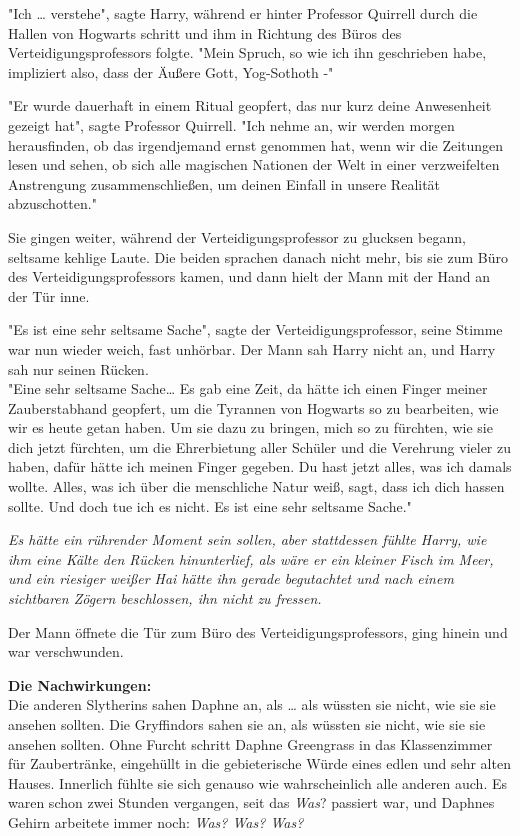 {"Ich … verstehe", sagte Harry, während er hinter Professor Quirrell durch die Hallen von Hogwarts schritt und ihm in Richtung des Büros des Verteidigungsprofessors folgte. "Mein Spruch, so wie ich ihn geschrieben habe, impliziert also, dass der Äußere Gott, Yog-Sothoth -"

"Er wurde dauerhaft in einem Ritual geopfert, das nur kurz deine Anwesenheit gezeigt hat", sagte Professor Quirrell. "Ich nehme an, wir werden morgen herausfinden, ob das irgendjemand ernst genommen hat, wenn wir die Zeitungen lesen und sehen, ob sich alle magischen Nationen der Welt in einer verzweifelten Anstrengung zusammenschließen, um deinen Einfall in unsere Realität abzuschotten."

Sie gingen weiter, während der Verteidigungsprofessor zu glucksen begann, seltsame kehlige Laute. Die beiden sprachen danach nicht mehr, bis sie zum Büro des Verteidigungsprofessors kamen, und dann hielt der Mann mit der Hand an der Tür inne.

"Es ist eine sehr seltsame Sache", sagte der Verteidigungsprofessor, seine Stimme war nun wieder weich, fast unhörbar. Der Mann sah Harry nicht an, und Harry sah nur seinen Rücken.\\ "Eine sehr seltsame Sache… Es gab eine Zeit, da hätte ich einen Finger meiner Zauberstabhand geopfert, um die Tyrannen von Hogwarts so zu bearbeiten, wie wir es heute getan haben. Um sie dazu zu bringen, mich so zu fürchten, wie sie dich jetzt fürchten, um die Ehrerbietung aller Schüler und die Verehrung vieler zu haben, dafür hätte ich meinen Finger gegeben. Du hast jetzt alles, was ich damals wollte. Alles, was ich über die menschliche Natur weiß, sagt, dass ich dich hassen sollte. Und doch tue ich es nicht. Es ist eine sehr seltsame Sache."

\emph{Es hätte ein rührender Moment sein sollen, aber stattdessen fühlte Harry, wie ihm eine Kälte den Rücken hinunterlief, als wäre er ein kleiner Fisch im Meer, und ein riesiger weißer Hai hätte ihn gerade begutachtet und nach einem sichtbaren Zögern beschlossen, ihn nicht zu fressen.}

Der Mann öffnete die Tür zum Büro des Verteidigungsprofessors, ging hinein und war verschwunden.

\textbf{Die Nachwirkungen:}\\ Die anderen Slytherins sahen Daphne an, als … als wüssten sie nicht, wie sie sie ansehen sollten. Die Gryffindors sahen sie an, als wüssten sie nicht, wie sie sie ansehen sollten. Ohne Furcht schritt Daphne Greengrass in das Klassenzimmer für Zaubertränke, eingehüllt in die gebieterische Würde eines edlen und sehr alten Hauses. Innerlich fühlte sie sich genauso wie wahrscheinlich alle anderen auch. Es waren schon zwei Stunden vergangen, seit das \emph{Was}? passiert war, und Daphnes Gehirn arbeitete immer noch: \emph{Was? Was? Was?}

}
